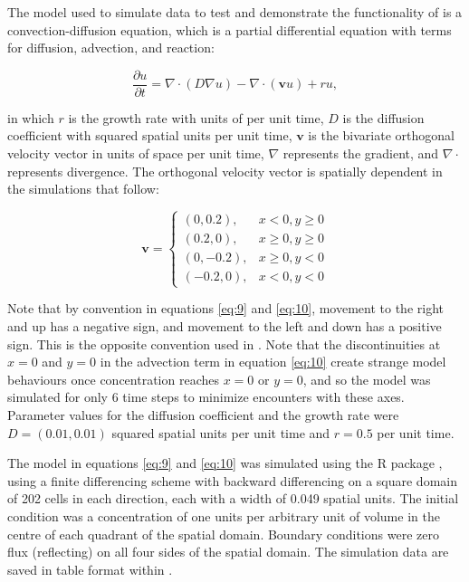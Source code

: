 The model used to simulate data to test and demonstrate the
functionality of  is a convection-diffusion
equation, which is a partial differential equation with terms for
diffusion, advection, and reaction:

\begin{equation}
\frac{\partial u}{\partial t} = \nabla \cdot \left(D \nabla u \right) - \nabla \cdot \left( \mathbf{v} u \right) + r u, 
\label{eq:9}
\end{equation}

\noindent in which \(r\) is the growth rate with units of per unit time,
\(D\) is the diffusion coefficient with squared spatial units per unit
time, \(\mathbf{v}\) is the bivariate orthogonal velocity vector in
units of space per unit time, \(\nabla\) represents the gradient, and
\(\nabla \cdot\) represents divergence. The orthogonal velocity vector
is spatially dependent in the simulations that follow:

\begin{equation}
\mathbf{v} = \begin{cases} \label{eq:10}
            (0, 0.2), & x < 0, y \geq 0\\
      (0.2, 0), & x \geq 0, y \geq 0\\
      (0, -0.2), & x \geq 0, y < 0\\
      (-0.2, 0), & x < 0, y < 0
         \end{cases}
\end{equation}

\noindent Note that by convention in equations \eqref{eq:9} and
\eqref{eq:10}, movement to the right and up has a negative sign, and
movement to the left and down has a positive sign. This is the opposite
convention used in . Note that the
discontinuities at \(x = 0\) and \(y = 0\) in the advection term in
equation \eqref{eq:10} create strange model behaviours once concentration
reaches \(x = 0\) or \(y = 0\), and so the model was simulated for only
6 time steps to minimize encounters with these axes. Parameter values
for the diffusion coefficient and the growth rate were
\(D = (0.01, 0.01)\) squared spatial units per unit time and \(r = 0.5\)
per unit time.

The model in equations \eqref{eq:9} and \eqref{eq:10} was simulated using
the  R package \citep{ReacTran}, using a finite
differencing scheme with backward differencing on a square domain of 202
cells in each direction, each with a width of 0.049 spatial units. The
initial condition was a concentration of one units per arbitrary unit of
volume in the centre of each quadrant of the spatial domain. Boundary
conditions were zero flux (reflecting) on all four sides of the spatial
domain. The simulation data are saved in table format within
.

